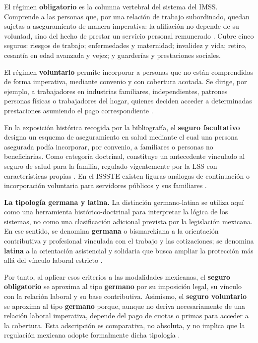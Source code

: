 \documentclass[12pt,letterpaper,oneside]{article}
\begin{document}
El régimen \textbf{obligatorio} es la columna vertebral del sistema del IMSS. Comprende a las personas que, por una relación de trabajo subordinado, quedan sujetas a aseguramiento de manera imperativa: la afiliación no depende de su voluntad, sino del hecho de prestar un servicio personal remunerado \citep{lss2026}. Cubre cinco seguros: riesgos de trabajo; enfermedades y maternidad; invalidez y vida; retiro, cesantía en edad avanzada y vejez; y guarderías y prestaciones sociales.

El régimen \textbf{voluntario} permite incorporar a personas que no están comprendidas de forma imperativa, mediante convenio y con cobertura acotada. Se dirige, por ejemplo, a trabajadores en industrias familiares, independientes, patrones personas físicas o trabajadores del hogar, quienes deciden acceder a determinadas prestaciones asumiendo el pago correspondiente \citep{lss2026,bricenoRuiz2011}.

En la exposición histórica recogida por la bibliografía, el \textbf{seguro facultativo} designa un esquema de aseguramiento en salud mediante el cual una persona asegurada podía incorporar, por convenio, a familiares o personas no beneficiarias. Como categoría doctrinal, constituye un antecedente vinculado al seguro de salud para la familia, regulado vigentemente por la LSS con características propias \citep{lss2026,bricenoRuiz2011}. En el ISSSTE existen figuras análogas de continuación o incorporación voluntaria para servidores públicos y sus familiares \citep{lissste2026}.

\medskip
\noindent\textbf{La tipología germana y latina.} La distinción germano-latina se utiliza aquí como una herramienta histórico-doctrinal para interpretar la lógica de los sistemas, no como una clasificación adicional prevista por la legislación mexicana. En ese sentido, se denomina \textbf{germana} o bismarckiana a la orientación contributiva y profesional vinculada con el trabajo y las cotizaciones; se denomina \textbf{latina} a la orientación asistencial y solidaria que busca ampliar la protección más allá del vínculo laboral estricto \citep{bricenoRuiz2011,cotonietoMartinez2021,moralesFajardo2021}.

Por tanto, al aplicar esos criterios a las modalidades mexicanas, el \textbf{seguro obligatorio} se aproxima al tipo \textbf{germano} por su imposición legal, su vínculo con la relación laboral y su base contributiva. Asimismo, el \textbf{seguro voluntario} se aproxima al tipo \textbf{germano} porque, aunque no deriva necesariamente de una relación laboral imperativa, depende del pago de cuotas o primas para acceder a la cobertura. Esta adscripción es comparativa, no absoluta, y no implica que la regulación mexicana adopte formalmente dicha tipología \citep{bricenoRuiz2011,cotonietoMartinez2021,gonzalezCarvallo2024}.
\end{document}
